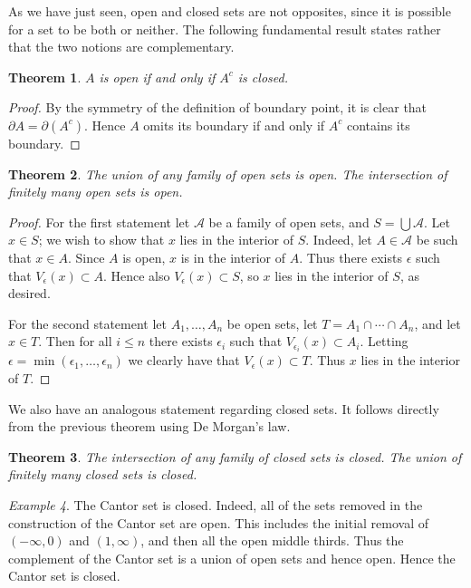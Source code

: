 \documentclass[11pt,oneside]{amsbook}
\theoremstyle{definition}
\theoremstyle{plain}
\newtheorem{thm}{Theorem}[section]
\theoremstyle{definition}
\theoremstyle{remark}
\newtheorem{example}[thm]{Example}
\numberwithin{equation}{section}
\numberwithin{figure}{section}
\begin{document}
As we have just seen, open and closed sets are not opposites, since it is possible for a set to be both or neither. The following fundamental result states rather that the two notions are complementary.

\begin{thm}
  $A$ is open if and only if $A^c$ is closed.
\end{thm}

\begin{proof}
  By the symmetry of the definition of boundary point, it is clear that $\partial A=\partial(A^c)$. Hence $A$ omits its boundary if and only if $A^c$ contains its boundary.
\end{proof}

\begin{thm}
  The union of any family of open sets is open. The intersection of finitely many open sets is open.
\end{thm}

\begin{proof}
  For the first statement let $\mathcal A$ be a family of open sets, and $S=\bigcup\mathcal A$. Let $x\in S$; we wish to show that $x$ lies in the interior of $S$. Indeed, let $A\in\mathcal A$ be such that $x\in A$. Since $A$ is open, $x$ is in the interior of $A$. Thus there exists $\epsilon$ such that $V_\epsilon(x)\subset A$. Hence also $V_\epsilon(x)\subset S$, so $x$ lies in the interior of $S$, as desired.

  For the second statement let $A_1,\ldots,A_n$ be open sets, let $T=A_1\cap\cdots\cap A_n$, and let $x\in T$. Then for all $i\leq n$ there exists $\epsilon_i$ such that $V_{\epsilon_i}(x)\subset A_i$. Letting $\epsilon=\min(\epsilon_1,\ldots,\epsilon_n)$ we clearly have that $V_\epsilon(x)\subset T$. Thus $x$ lies in the interior of $T$.
\end{proof}

We also have an analogous statement regarding closed sets. It follows directly from the previous theorem using De Morgan's law.

\begin{thm}
  The intersection of any family of closed sets is closed. The union of finitely many closed sets is closed.
\end{thm}

\begin{example}
  The Cantor set is closed. Indeed, all of the sets removed in the construction of the Cantor set are open. This includes the initial removal of $(-\infty,0)$ and $(1,\infty)$, and then all the open middle thirds. Thus the complement of the Cantor set is a union of open sets and hence open. Hence the Cantor set is closed.
\end{example}
\end{document}
